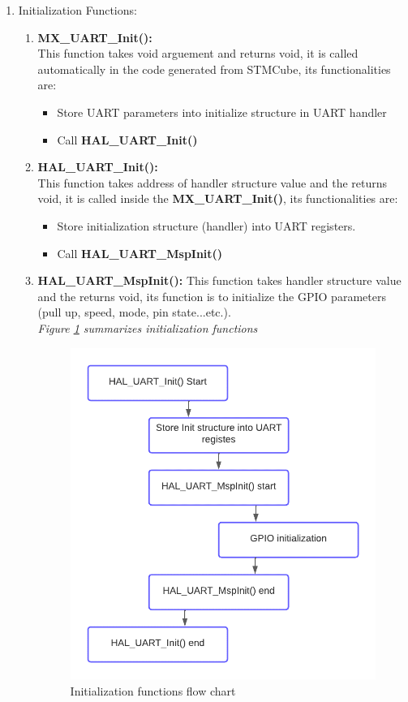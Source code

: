 \begin{enumerate}
    \item Initialization Functions:
    \begin{enumerate}
        \item \textbf{MX\_UART\_Init():}\\
        This function takes void arguement and returns void, it is called automatically in the code generated from STMCube, its functionalities are:
        \begin{itemize}
            \item Store UART parameters into initialize structure in UART handler
            \item Call \textbf{HAL\_UART\_Init()}
        \end{itemize}
        
        \item \textbf{HAL\_UART\_Init():}\\
        This function takes address of handler structure value and the returns void, it is called inside the \textbf{MX\_UART\_Init()}, its functionalities are:
        \begin{itemize}
            \item Store initialization structure (handler) into UART registers.
            \item Call \textbf{HAL\_UART\_MspInit()}
        \end{itemize}
        
        \item \textbf{HAL\_UART\_MspInit():}
        This function takes handler structure value and the returns void, its function is to initialize the GPIO parameters (pull up, speed, mode, pin state...etc.).\\
        
     
        \emph{Figure \ref{fig:init-flow-chart} summarizes initialization functions}
        
        \begin{figure}[h]
        \centering
        \includegraphics[width=.75\textwidth]{figure/4_4.png}
        \caption{Initialization functions flow chart}
        \label{fig:init-flow-chart}
    \end{figure}


\end{enumerate}
\end{enumerate}
